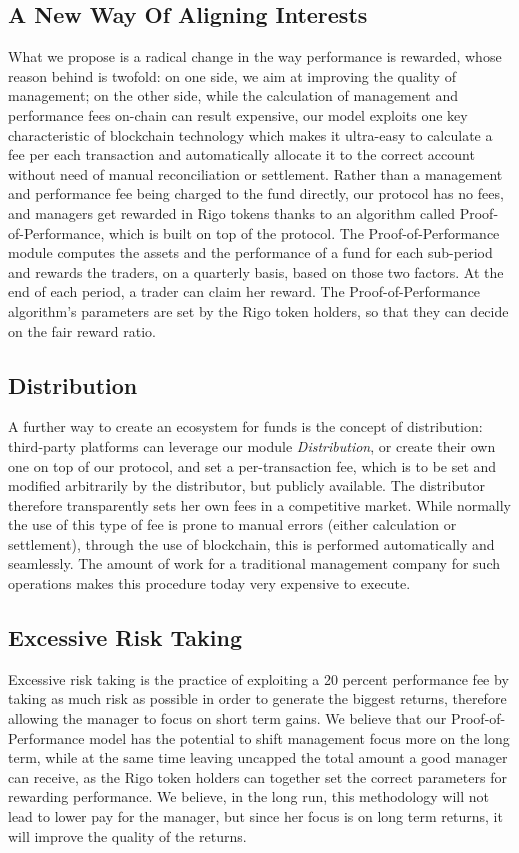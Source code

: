 \documentclass[9pt,oneside]{amsart}
\begin{document}
\begin{multicols}{2}
\subsection{A New Way Of Aligning Interests}
What we propose is a radical change in the way performance is rewarded, whose reason behind is twofold: on one side, we aim at improving the quality of management; on the other side, while the calculation of management and performance fees on-chain can result expensive, our model exploits one key characteristic of blockchain technology which makes it ultra-easy to calculate a fee per each transaction and automatically allocate it to the correct account without need of manual reconciliation or settlement.
Rather than a management and performance fee being charged to the fund directly, our protocol has no fees, and managers get rewarded in Rigo tokens thanks to an algorithm called Proof-of-Performance, which is built on top of the protocol.
The Proof-of-Performance module computes the assets and the performance of a fund for each sub-period and rewards the traders, on a quarterly basis, based on those two factors. At the end of each period, a trader can claim her reward.
The Proof-of-Performance algorithm's parameters are set by the Rigo token holders, so that they can decide on the fair reward ratio.

\subsection{Distribution}
A further way to create an ecosystem for funds is the concept of distribution: third-party platforms can leverage our module \textit{Distribution}, or create their own one on top of our protocol, and set a per-transaction fee, which is to be set and modified arbitrarily by the distributor, but publicly available. The distributor therefore transparently sets her own fees in a competitive market. While normally the use of this type of fee is prone to manual errors (either calculation or settlement), through the use of blockchain, this is performed automatically and seamlessly. The amount of work for a traditional management company for such operations makes this procedure today very expensive to execute.

\subsection{Excessive Risk Taking}
Excessive risk taking is the practice of exploiting a 20 percent performance fee by taking as much risk as possible in order to generate the biggest returns, therefore allowing the manager to focus on short term gains. We believe that our Proof-of-Performance model has the potential to shift management focus more on the long term, while at the same time leaving uncapped the total amount a good manager can receive, as the Rigo token holders can together set the correct parameters for rewarding performance. We believe, in the long run, this methodology will not lead to lower pay for the manager, but since her focus is on long term returns, it will improve the quality of the returns.


\end{multicols}
\end{document}
